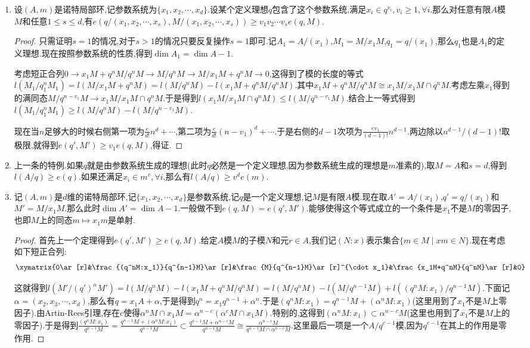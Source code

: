 \begin{enumerate}
\begin{proof}
		因为$A$是整环,唯一的极小素理想是零理想,此时$K=A_{(0)}$是$A$的商域,按照上一条有$e(\mathfrak{q},M)=e(\mathfrak{q})\cdot l(M_{(0)})$.但是这里$M_{(0)}$作为$K$模的维数恰好是$\mathrm{rank}(M)$.
	\end{proof}
	\item 设$(A,m)$是诺特局部环,记参数系统为$\{x_1,x_2,\cdots,x_d\}$.设某个定义理想$q$包含了这个参数系统,满足$x_i\in q^{v_i},v_i\ge1,\forall i$.那么对任意有限$A$模$M$和任意$1\le s\le d$,有$e(q/(x_1,x_2,\cdots,x_s),M/(x_1,x_2,\cdots,x_s))\ge v_1v_2\cdots v_s e(q,M)$.
	\begin{proof}
		
		只需证明$s=1$的情况,对于$s>1$的情况只要反复操作$s=1$即可.记$A_1=A/(x_1)$,$M_1=M/x_1M$,$q_1=q/(x_1)$,那么$q_1$也是$A_1$的定义理想.现在按照参数系统的性质,得到$\dim A_1=\dim A-1$.
		
		考虑短正合列$0\to x_1M+q^nM/q^nM\to M/q^nM\to M/x_1M+q^nM\to0$,这得到了模的长度的等式$l(M_1/q_1^nM_1)=l(M/x_1M+q^nM)=l(M/q^nM)-l(x_1M+q^nM/q^nM)$.其中$x_1M+q^nM/q^nM\cong x_1M/x_1M\cap q^nM$.考虑左乘$x_1$得到的满同态$M/q^{n-v_1}M\to x_1M/x_1M\cap q^nM$.于是得到$l(x_1M/x_1M\cap q^nM)\le l(M/q^{n-v_1}M)$.结合上一等式得到$l(M_1/q_1^nM_1)\ge l(M/q^nM)-l(M/q^{n-v_1}M)$.
		
		现在当$n$足够大的时候右侧第一项为$\frac{e}{d!}n^d+\cdots$,第二项为$\frac{e}{d!}(n-v_1)^d+\cdots$.于是右侧的$d-1$次项为$\frac{ev_1}{(d-1)!}n^{d-1}$.两边除以$n^{d-1}/(d-1)!$取极限,就得到$e(q',M')\ge v_1e(q,M)$,得证.
	\end{proof}
	\item 上一条的特例.如果$q$就是由参数系统生成的理想(此时$q$必然是一个定义理想,因为参数系统生成的理想是$m$准素的),取$M=A$和$s=d$,得到$l(A/q)\ge e(q)$.如果还满足$x_i\in m^v,\forall i$,那么有$l(A/q)\ge v^de(m)$.
	\item 记$(A,m)$是$d$维的诺特局部环,记$\{x_1,x_2,\cdots,x_d\}$是参数系统,记$q$是一个定义理想,记$M$是有限$A$模.现在取$A'=A/(x_1)$,$q'=q/(x_1)$和$M'=M/x_1M$.那么此时$\dim A'=\dim A-1$.一般做不到$e(q,M)=e(q',M')$.能够使得这个等式成立的一个条件是$x_1$不是$M$的零因子,也即$M$上的同态$m\mapsto x_1m$是单射.
	\begin{proof}
		
		首先上一个定理得到$e(q',M')\ge e(q,M)$.给定$A$模$M$的子模$N$和元$r\in A$,我们记$(N:x)$表示集合$\{m\in M\mid xm\in N\}$.现在考虑如下短正合列:
		$$\xymatrix{0\ar[r]&\frac{(q^nM:x_1)}{q^{n-1}M}\ar[r]&\frac{M}{q^{n-1}M}\ar[r]^{\cdot x_1}&\frac{x_1M+q^nM}{q^nM}\ar[r]&0}$$
		
		这就得到$l(M'/(q')^nM')=l(M/q^nM)-l(x_1M+q^nM/q^nM)=l(M/q^nM)-l(M/q^{n-1}M)+l((q^nM:x_1)/q^{n-1}M)$.下面记$\alpha=(x_2,x_3,\cdots,x_d)$,那么有$q=x_1A+\alpha$,于是得到$q^n=x_1q^{n-1}+\alpha^n$.于是$(q^nM:x_1)=q^{n-1}M+(\alpha^nM:x_1)$(这里用到了$x_1$不是$M$上零因子).由Artin-Rees引理,存在$c$使得$\alpha^nM\cap x_1M=\alpha^{n-c}(\alpha^cM\cap x_1M)$.特别的,这得到$(\alpha^nM:x_1)\subset\alpha^{n-c}M$(这里也用到了$x_1$不是$M$上的零因子).于是得到$\frac{(q^nM:x_1)}{q^{n-1}M}=\frac{q^{n-1}M+(\alpha^nM:x_1)}{q^{n-1}M}\subset\frac{q^{n-1}M+\alpha^{n-c}M}{q^{n-1}M}\cong\frac{\alpha^{n-c}M}{q^{n-1}M\cap\alpha^{n-c}M}$.这里最后一项是一个$A/q^{c-1}$模,因为$q^{c-1}$在其上的作用是零作用.
		

\end{proof}
\end{enumerate}
